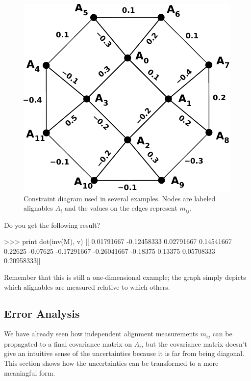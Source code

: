 \documentclass[12pt]{article}
\begin{document}
\begin{figure}
\begin{center}
\includegraphics[width=0.5\linewidth]{PLOTS/toy_example.pdf}
\end{center}
\caption{Constraint diagram used in several examples.  Nodes are
  labeled alignables $A_i$ and the values on the edges represent
  $m_{ij}$. \label{fig:twelve_alignables}}
\end{figure}

Do you get the following result?
\begin{python}
>>> print dot(inv(M), v)
[[ 0.01791667 -0.12458333  0.02791667  0.14541667  0.22625    -0.07625
  -0.17291667 -0.26041667 -0.18375     0.13375     0.05708333  0.20958333]]
\end{python}
Remember that this is still a one-dimensional example; the graph
simply depicts which alignables are measured relative to which others.

\subsection{Error Analysis}

We have already seen how independent alignment measurements $m_{ij}$
can be propagated to a final covariance matrix on $A_i$, but the
covariance matrix doesn't give an intuitive sense of the uncertainties
because it is far from being diagonal.  This section shows how the
uncertainties can be transformed to a more meaningful form.
\end{document}

